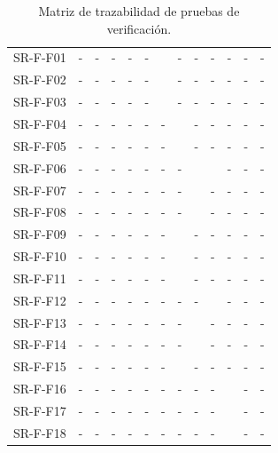 \begin{table}[htb]
  \centering
  \caption{Matriz de trazabilidad de pruebas de verificación.}
  \begin{tabular}{@{}L{3cm}C{0.7cm}C{0.7cm}C{0.7cm}C{0.7cm}C{0.7cm}C{0.7cm}C{0.7cm}C{0.7cm}C{0.7cm}C{0.7cm}C{0.7cm}C{0.7cm}@{}}
    \toprule
      &  &  &  &  &  &  &  &  &  &  &  & \\
    \midrule
    SR-F-F01 & - & - & - & - & - &  & - & - & - & - & - & - \\
    SR-F-F02 & - & - & - & - & - &  & - & - & - & - & - & - \\
    SR-F-F03 & - & - & - & - & - &  & - & - & - & - & - & - \\
    SR-F-F04 & - & - & - & - & - & - &  & - & - & - & - & - \\
    SR-F-F05 & - & - & - & - & - & - &  & - & - & - & - & - \\
    SR-F-F06 & - & - & - & - & - & - & - &  &  & - & - & - \\
    SR-F-F07 & - & - & - & - & - & - & - &  & - & - & - & - \\
    SR-F-F08 & - & - & - & - & - & - & - &  & - & - & - & - \\
    SR-F-F09 & - & - & - & - & - & - &  & - & - & - & - & - \\
    SR-F-F10 & - & - & - & - & - & - &  & - & - & - & - & - \\
    SR-F-F11 & - & - & - & - & - & - &  & - & - & - & - & - \\
    SR-F-F12 & - & - & - & - & - & - & - & - &  & - & - & - \\
    SR-F-F13 & - & - & - & - & - & - & - &  & - & - & - & - \\
    SR-F-F14 & - & - & - & - & - & - & - &  & - & - & - & - \\
    SR-F-F15 & - & - & - & - & - & - &  & - & - & - & - & - \\
     SR-F-F16 & - & - & - & - & - & - & - & - & - &  & - & - \\
    SR-F-F17 & - & - & - & - & - & - & - & - & - &  & - & - \\
    SR-F-F18 & - & - & - & - & - & - & - & - & - &  & - & - \\

\end{tabular}
\end{table}
